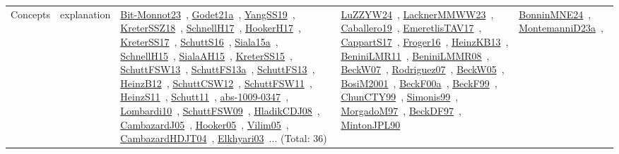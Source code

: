 {\begin{longtable}{lp{3cm}>{\raggedright\arraybackslash}p{6cm}>{\raggedright\arraybackslash}p{6cm}>{\raggedright\arraybackslash}p{8cm}}
Concepts & explanation & \href{../works/Bit-Monnot23.pdf}{Bit-Monnot23}~\cite{Bit-Monnot23}, \href{../works/Godet21a.pdf}{Godet21a}~\cite{Godet21a}, \href{../works/YangSS19.pdf}{YangSS19}~\cite{YangSS19}, \href{../works/KreterSSZ18.pdf}{KreterSSZ18}~\cite{KreterSSZ18}, \href{../works/SchnellH17.pdf}{SchnellH17}~\cite{SchnellH17}, \href{../works/HookerH17.pdf}{HookerH17}~\cite{HookerH17}, \href{../works/KreterSS17.pdf}{KreterSS17}~\cite{KreterSS17}, \href{../works/SchuttS16.pdf}{SchuttS16}~\cite{SchuttS16}, \href{../works/Siala15a.pdf}{Siala15a}~\cite{Siala15a}, \href{../works/SchnellH15.pdf}{SchnellH15}~\cite{SchnellH15}, \href{../works/SialaAH15.pdf}{SialaAH15}~\cite{SialaAH15}, \href{../works/KreterSS15.pdf}{KreterSS15}~\cite{KreterSS15}, \href{../works/SchuttFSW13.pdf}{SchuttFSW13}~\cite{SchuttFSW13}, \href{../works/SchuttFS13a.pdf}{SchuttFS13a}~\cite{SchuttFS13a}, \href{../works/SchuttFS13.pdf}{SchuttFS13}~\cite{SchuttFS13}, \href{../works/HeinzB12.pdf}{HeinzB12}~\cite{HeinzB12}, \href{../works/SchuttCSW12.pdf}{SchuttCSW12}~\cite{SchuttCSW12}, \href{../works/SchuttFSW11.pdf}{SchuttFSW11}~\cite{SchuttFSW11}, \href{../works/HeinzS11.pdf}{HeinzS11}~\cite{HeinzS11}, \href{../works/Schutt11.pdf}{Schutt11}~\cite{Schutt11}, \href{../works/abs-1009-0347.pdf}{abs-1009-0347}~\cite{abs-1009-0347}, \href{../works/Lombardi10.pdf}{Lombardi10}~\cite{Lombardi10}, \href{../works/SchuttFSW09.pdf}{SchuttFSW09}~\cite{SchuttFSW09}, \href{../works/HladikCDJ08.pdf}{HladikCDJ08}~\cite{HladikCDJ08}, \href{../works/CambazardJ05.pdf}{CambazardJ05}~\cite{CambazardJ05}, \href{../works/Hooker05.pdf}{Hooker05}~\cite{Hooker05}, \href{../works/Vilim05.pdf}{Vilim05}~\cite{Vilim05}, \href{../works/CambazardHDJT04.pdf}{CambazardHDJT04}~\cite{CambazardHDJT04}, \href{../works/Elkhyari03.pdf}{Elkhyari03}~\cite{Elkhyari03}... (Total: 36) & \href{../works/LuZZYW24.pdf}{LuZZYW24}~\cite{LuZZYW24}, \href{../works/LacknerMMWW23.pdf}{LacknerMMWW23}~\cite{LacknerMMWW23}, \href{../works/Caballero19.pdf}{Caballero19}~\cite{Caballero19}, \href{../works/EmeretlisTAV17.pdf}{EmeretlisTAV17}~\cite{EmeretlisTAV17}, \href{../works/CappartS17.pdf}{CappartS17}~\cite{CappartS17}, \href{../works/Froger16.pdf}{Froger16}~\cite{Froger16}, \href{../works/HeinzKB13.pdf}{HeinzKB13}~\cite{HeinzKB13}, \href{../works/BeniniLMR11.pdf}{BeniniLMR11}~\cite{BeniniLMR11}, \href{../works/BeniniLMMR08.pdf}{BeniniLMMR08}~\cite{BeniniLMMR08}, \href{../works/BeckW07.pdf}{BeckW07}~\cite{BeckW07}, \href{../works/Rodriguez07.pdf}{Rodriguez07}~\cite{Rodriguez07}, \href{../works/BeckW05.pdf}{BeckW05}~\cite{BeckW05}, \href{../works/BosiM2001.pdf}{BosiM2001}~\cite{BosiM2001}, \href{../works/BeckF00a.pdf}{BeckF00a}~\cite{BeckF00a}, \href{../works/BeckF99.pdf}{BeckF99}~\cite{BeckF99}, \href{../works/ChunCTY99.pdf}{ChunCTY99}~\cite{ChunCTY99}, \href{../works/Simonis99.pdf}{Simonis99}~\cite{Simonis99}, \href{../works/MorgadoM97.pdf}{MorgadoM97}~\cite{MorgadoM97}, \href{../works/BeckDF97.pdf}{BeckDF97}~\cite{BeckDF97}, \href{../works/MintonJPL90.pdf}{MintonJPL90}~\cite{MintonJPL90} & \href{../works/BonninMNE24.pdf}{BonninMNE24}~\cite{BonninMNE24}, \href{../works/MontemanniD23a.pdf}{MontemanniD23a}~\cite{MontemanniD23a}, 
\end{longtable}}
